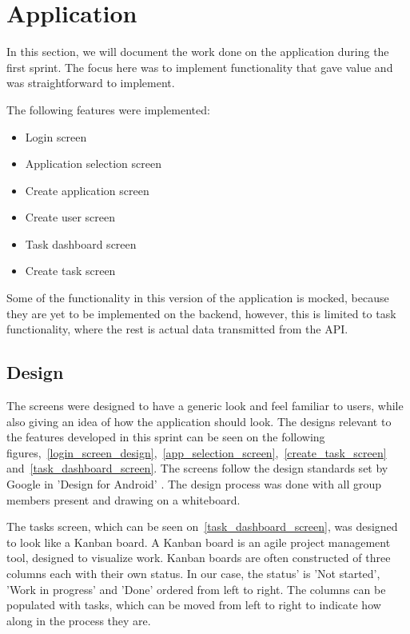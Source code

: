 \section{Application}\label{sec:sprint-one-application}
In this section, we will document the work done on the application during the first sprint.
The focus here was to implement functionality that gave value and was straightforward to implement.

The following features were implemented:

\begin{itemize}
    \item Login screen
    \item Application selection screen
    \item Create application screen
    \item Create user screen
    \item Task dashboard screen
    \item Create task screen
\end{itemize}

Some of the functionality in this version of the application is mocked, because they are yet to be implemented on the backend, however, this is limited to task functionality, where the rest is actual data transmitted from the API.

\subsection{Design}
\label{sprint_1_design}
The screens were designed to have a generic look and feel familiar to users, while also giving an idea of how the application should look.
The designs relevant to the features developed in this sprint can be seen on the following figures,~\autoref{login_screen_design},~\autoref{app_selection_screen},~\autoref{create_task_screen} and~\autoref{task_dashboard_screen}.
The screens follow the design standards set by Google in 'Design for Android' \cite{AndroidDesign}.
The design process was done with all group members present and drawing on a whiteboard.

The tasks screen, which can be seen on~\autoref{task_dashboard_screen}, was designed to look like a Kanban board.
A Kanban board is an agile project management tool, designed to visualize work.
Kanban boards are often constructed of three columns each with their own status. 
In our case, the status' is 'Not started', 'Work in progress' and 'Done' ordered from left to right.
The columns can be populated with tasks, which can be moved from left to right to indicate how along in the process they are.

